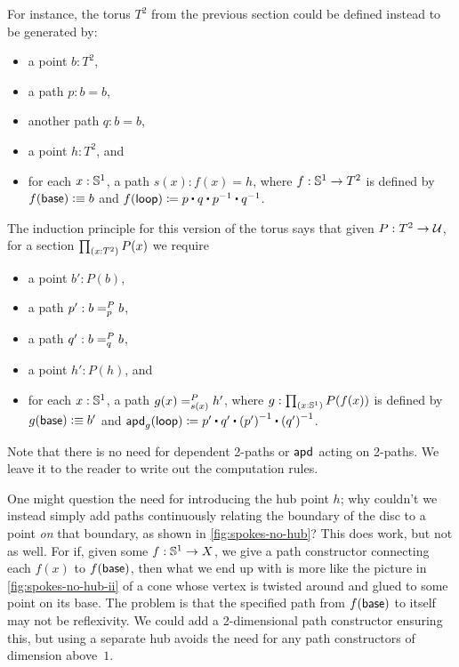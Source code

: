 For instance, the torus $T^2$ from the previous section could be defined instead to be generated by:
\begin{itemize}
\item a point $b:T^2$,
\item a path $p:b=b$,
\item another path $q:b=b$,
\item a point $h:T^2$, and
\item for each $x:\Sn^1$, a path $s(x) : f(x)=h$, where $f:\Sn^1\to T^2$ is defined by $f(\base)\defeq b$ and $\ap f \lloop \defid p \ct q \ct \opp p \ct \opp q$.
\end{itemize}
The induction principle for this version of the torus says that given $P:T^2\to\type$, for a section $\prd{x:T^2} P(x)$ we require
\begin{itemize}
\item a point $b':P(b)$,
\item a path $p' : \dpath P p b b$,
\item a path $q' : \dpath P q b b$,
\item a point $h':P(h)$, and
\item for each $x:\Sn^1$, a path $\dpath {P}{s(x)}{g(x)}{h'}$, where $g:\prd{x:\Sn^1} P(f(x))$ is defined by $g(\base)\defeq b'$ and $\apd g \lloop \defid p' \ct q' \ct \opp{(p')} \ct \opp{(q')}$.
\end{itemize}
Note that there is no need for dependent 2-paths or $\apdfunc{}$ acting on 2-paths.
We leave it to the reader to write out the computation rules.

\begin{rmk}\label{rmk:spokes-no-hub}
One might question the need for introducing the hub point $h$; why couldn't we instead simply add paths continuously relating the boundary of the disc to a point \emph{on} that boundary, as shown in \autoref{fig:spokes-no-hub}?
This does work, but not as well.
For if, given some $f:\Sn^1 \to X$, we give a path constructor connecting each $f(x)$ to $f(\base)$, then what we end up with is more like the picture in \autoref{fig:spokes-no-hub-ii} of a cone whose vertex is twisted around and glued to some point on its base.
The problem is that the specified path from $f(\base)$ to itself may not be reflexivity.
We could add a 2-dimensional path constructor ensuring this, but using a separate hub avoids the need for any path constructors of dimension above~$1$.
\end{rmk}

